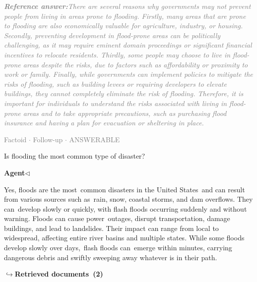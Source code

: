 \documentclass[a4paper,11pt]{article}
\begin{document}
\begin{refanswerenv}
{\footnotesize\textit{\textcolor{gray}{\textbf{Reference answer:}\enspace There are several reasons why governments may not prevent people from living in areas prone to flooding. Firstly, many areas that are prone to flooding are also economically valuable for agriculture, industry, or housing. Secondly, preventing development in flood-prone areas can be politically challenging, as it may require eminent domain proceedings or significant financial incentives to relocate residents. Thirdly, some people may choose to live in flood-prone areas despite the risks, due to factors such as affordability or proximity to work or family. Finally, while governments can implement policies to mitigate the risks of flooding, such as building levees or requiring developers to elevate buildings, they cannot completely eliminate the risk of flooding. Therefore, it is important for individuals to understand the risks associated with living in flood-prone areas and to take appropriate precautions, such as purchasing flood insurance and having a plan for evacuation or sheltering in place.}}}
\end{refanswerenv}
\vspace{0.5em}
\hfill{\tiny\textcolor{gray}{Factoid $\cdot$ Follow-up $\cdot$ ANSWERABLE}}
\begin{userbubble}
Is flooding the most common type of disaster?
\end{userbubble}
\noindent\hfill{\small\textcolor{agentcolor}{\textbf{Agent\enspace$\triangleleft$}}}
\begin{agentbubble}
Yes, floods are the most common disasters in the United States and can result from various sources such as rain, snow, coastal storms, and dam overflows. They can develop slowly or quickly, with flash floods occurring suddenly and without warning. Floods can cause power outages, disrupt transportation, damage buildings, and lead to landslides. Their impact can range from local to widespread, affecting entire river basins and multiple states. While some floods develop slowly over days, flash floods can emerge within minutes, carrying dangerous debris and swiftly sweeping away whatever is in their path.
\end{agentbubble}
\noindent\hfill{\footnotesize\textcolor{doccolor}{\textbf{$\hookrightarrow$\enspace Retrieved documents~(2)}}}
\end{document}
